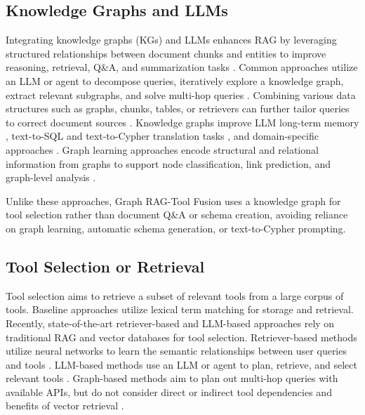 \subsection{Knowledge Graphs and LLMs} Integrating knowledge graphs (KGs) and LLMs enhances RAG by leveraging structured relationships between document chunks and entities to improve reasoning, retrieval, Q\&A, and summarization tasks \cite{peng2024graphretrievalaugmentedgenerationsurvey, neo4j_graphrag_2024}. Common approaches utilize an LLM or agent to decompose queries, iteratively explore a knowledge graph, extract relevant subgraphs, and solve multi-hop queries \cite{sun2024thinkongraphdeepresponsiblereasoning, li2024decodinggraphsfaithfulsound, jin2024graphchainofthoughtaugmentinglarge,hu2024graggraphretrievalaugmentedgeneration}. Combining various data structures such as graphs, chunks, tables, or retrievers can further tailor queries to correct document sources \cite{li2024structragboostingknowledgeintensive,sarmah2024hybridragintegratingknowledgegraphs}. Knowledge graphs improve LLM long-term memory \cite{gutiérrez2024hipporagneurobiologicallyinspiredlongterm}, text-to-SQL and text-to-Cypher translation tasks \cite{sequeda2023benchmarkunderstandroleknowledge,ozsoy2024text2cypherbridgingnaturallanguage}, and domain-specific approaches \cite{wu2024medicalgraphragsafe}. Graph learning approaches encode structural and relational information from graphs to support node classification, link prediction, and graph-level analysis \cite{he2024gretrieverretrievalaugmentedgenerationtextual,jiang2023diffkgknowledgegraphdiffusion,zaratiana2024grapherstructureawaretexttographmodel}.

Unlike these approaches, Graph RAG-Tool Fusion uses a knowledge graph for tool selection rather than document Q\&A or schema creation, avoiding reliance on graph learning, automatic schema generation, or text-to-Cypher prompting.

\subsection{Tool Selection or Retrieval}
Tool selection aims to retrieve a subset of relevant tools from a large corpus of tools. Baseline approaches utilize lexical term matching for storage and retrieval. Recently, state-of-the-art retriever-based and LLM-based approaches rely on traditional RAG and vector databases for tool selection. Retriever-based methods utilize neural networks to learn the semantic relationships between user queries and tools \cite{anantha_protip_2023,chen2024reinvoketoolinvocationrewriting,lumer2024toolshedscaletoolequippedagents,moon_efficient_2024}. LLM-based methods use an LLM or agent to plan, retrieve, and select relevant tools \cite{yuan_easytool_2024,li_api_bank_2023,du_anytool_2024}. Graph-based methods aim to plan out multi-hop queries with available APIs, but do not consider direct or indirect tool dependencies and benefits of vector retrieval \cite{liu2024toolnetconnectinglargelanguage,liu2023controlllmaugmentlanguagemodels,zhang2023graphtoolformerempowerllmsgraph}.

